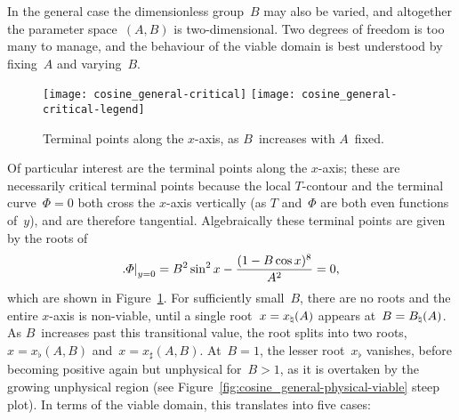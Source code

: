 In the general case the dimensionless group~$B$ may also be varied,
and altogether the parameter space~$(A, B)$ is two-dimensional.
Two degrees of freedom is too many to manage,
and the behaviour of the viable domain is best understood
by fixing~$A$ and varying~$B$.

\begin{figure}
  \newcommand*{\legendoffsetheight}{0.1\textwidth}
  \centering
  \texttt{[image: cosine\_general-critical]}
  \texttt{[image: cosine\_general-critical-legend]}
  \caption{
    Terminal points along the $x$-axis, as $B$~increases with $A$~fixed.
  }
  \label{fig:cosine_general-critical}
\end{figure}

Of particular interest are the terminal points along the $x$-axis;
these are necessarily critical terminal points
because the local $T$-contour and the terminal curve~$\Phi = 0$
both cross the $x$-axis vertically
(as $T$ and~$\Phi$ are both even functions of~$y$),
and are therefore tangential.
Algebraically these terminal points are given by the roots of
\begin{equation}
  \eval[\textsize]{\Phi}_{y=0}
  = B^2 \sin^2 x - \frac{(1 - B \cos x)^8}{A^2}
  = 0,
  \label{eq:cosine-general-critical-terminal-point-x}
\end{equation}
which are shown in Figure~\ref{fig:cosine_general-critical}.
For sufficiently small~$B$,
there are no roots and the entire $x$-axis is non-viable,
until a single root~$x = x_\natural (A)$ appears at~$B = B_\natural (A)$.
As $B$~increases past this transitional value,
the root splits into two roots, $x = x_\flat (A, B)$ and~$x = x_\sharp (A, B)$.
At~$B = 1$, the lesser root~$x_\flat$ vanishes,
before becoming positive again but unphysical for~$B > 1$,
as it is overtaken by the growing unphysical region
(see Figure~\ref{fig:cosine_general-physical-viable} steep plot).
In terms of the viable domain, this translates into five cases:
